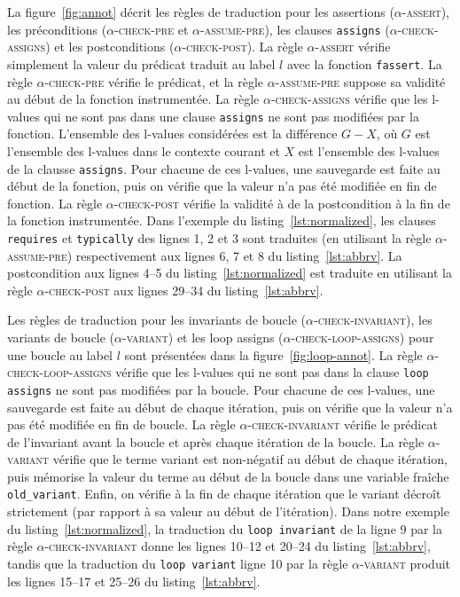 La figure~\ref{fig:annot} décrit les règles de traduction pour les assertions
(\textsc{$\alpha$-assert}), les préconditions (\textsc{$\alpha$-check-pre} et
\textsc{$\alpha$-assume-pre}), les clauses \lstinline'assigns'
(\textsc{$\alpha$-check-assigns}) et les postconditions
(\textsc{$\alpha$-check-post}).
La règle \textsc{$\alpha$-assert} vérifie simplement la valeur du prédicat
traduit au label $l$ avec la fonction \lstinline'fassert'.
La règle \textsc{$\alpha$-check-pre} vérifie le prédicat, et la règle
\textsc{$\alpha$-assume-pre} suppose sa validité au début de la fonction
instrumentée.
La règle \textsc{$\alpha$-check-assigns} vérifie que les l-values qui ne sont
pas dans une clause \lstinline'assigns' ne sont pas modifiées par la fonction.
L'ensemble des l-values considérées est la différence $G-X$, où $G$ est
l'ensemble des l-values dans le contexte courant et $X$ est l'ensemble des
l-values de la clausse \lstinline'assigns'.
Pour chacune de ces l-values, une sauvegarde est faite au début de la fonction,
puis on vérifie que la valeur n'a pas été modifiée en fin de fonction.
La règle \textsc{$\alpha$-check-post} vérifie la validité à de la postcondition
à la fin de la fonction instrumentée.
Dans l'exemple du listing~\ref{lst:normalized}, les clauses \lstinline'requires'
et \lstinline'typically' des lignes 1, 2 et 3 sont traduites (en utilisant la
règle \textsc{$\alpha$-assume-pre}) respectivement aux lignes 6, 7 et 8 du
listing~\ref{lst:abbrv}.
La postcondition aux lignes 4--5 du listing~\ref{lst:normalized} est traduite
en utilisant la règle \textsc{$\alpha$-check-post} aux lignes 29--34 du
listing~\ref{lst:abbrv}.

Les règles de traduction pour les invariants de boucle
(\textsc{$\alpha$-check-invariant}), les variants de boucle
(\textsc{$\alpha$-variant}) et les loop assigns
(\textsc{$\alpha$-check-loop-assigns})
pour une boucle au label $l$ sont présentées dans la
figure~\ref{fig:loop-annot}.
La règle \textsc{$\alpha$-check-loop-assigns} vérifie que les l-values qui ne
sont pas dans la clause \lstinline'loop assigns' ne sont pas modifiées par la
boucle.
Pour chacune de ces l-values, une sauvegarde est faite au début de chaque
itération, puis on vérifie que la valeur n'a pas été modifiée en fin de boucle.
La règle \textsc{$\alpha$-check-invariant} vérifie le prédicat de l'invariant
avant la boucle et après chaque itération de la boucle.
La règle \textsc{$\alpha$-variant} vérifie que le terme variant est non-négatif
au début de chaque itération, puis mémorise la valeur du terme au début de la
boucle dans une variable fraîche \lstinline|old_variant|.
Enfin, on vérifie à la fin de chaque itération que le variant décroît
strictement (par rapport à sa valeur au début de l'itération).
Dans notre exemple du listing~\ref{lst:normalized}, la traduction du
\lstinline'loop invariant' de la ligne 9 par la règle
\textsc{$\alpha$-check-invariant} donne les lignes 10--12 et 20--24 du
listing~\ref{lst:abbrv}, tandis que la traduction du \lstinline'loop variant'
ligne 10 par la règle \textsc{$\alpha$-variant} produit les lignes 15--17 et
25--26 du listing~\ref{lst:abbrv}.





